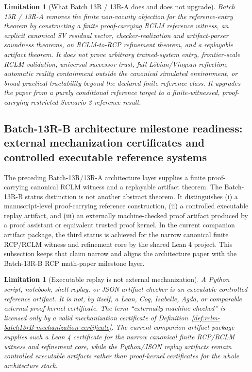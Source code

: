 \documentclass[11pt,a4paper]{article}
\newtheorem{limitation}[theorem]{Limitation}
\begin{document}
\begin{limitation}[What Batch 13R / 13R-A does and does not upgrade]
\label{lim:rclm-batch13r-scope}
Batch 13R / 13R-A removes the finite non-vacuity objection for the reference-entry theorem by constructing a finite proof-carrying RCLM reference witness, an explicit canonical SV residual vector, checker-realization and artifact-parser soundness theorems, an RCLM-to-RCP refinement theorem, and a replayable artifact theorem.  It does not prove arbitrary trained-system entry, frontier-scale RCLM validation, universal successor trust, full L\"obian/Vingean reflection, automatic reality containment outside the canonical simulated environment, or broad practical tractability beyond the declared finite reference class.  It upgrades the paper from a purely conditional reference target to a finite-witnessed, proof-carrying restricted Scenario-3 reference result.
\end{limitation}



\subsection{Batch-13R-B architecture milestone readiness: external mechanization certificates and controlled executable reference systems}
\label{subsec:rclm-batch13rB-mechanized-controlled}

The preceding Batch-13R/13R-A architecture layer supplies a finite proof-carrying canonical RCLM witness and a replayable artifact theorem.  The Batch-13R-B status distinction is not another abstract theorem.  It distinguishes (i) a manuscript-level proof-carrying reference construction, (ii) a controlled executable replay artifact, and (iii) an externally machine-checked proof artifact produced by a proof assistant or equivalent trusted proof kernel.  In the current companion artifact package, the third status is achieved for the narrow canonical finite RCP/RCLM witness and refinement core by the shared Lean 4 project.  This subsection keeps that claim narrow and aligns the architecture paper with the Batch-13R-B RCP math-paper milestone layer.

\begin{limitation}[Executable replay is not external mechanization]
\label{lim:rclm-batch13rB-replay-not-mechanization}
A Python script, notebook, shell replay, or JSON artifact checker is an executable controlled reference artifact.  It is not, by itself, a Lean, Coq, Isabelle, Agda, or comparable external proof-kernel certificate.  The term ``externally machine-checked'' is licensed only by a valid mechanization certificate of Definition~\ref{def:rclm-batch13rB-mechanization-certificate}.  The current companion artifact package supplies such a Lean 4 certificate for the narrow canonical finite RCP/RCLM witness and refinement core, while the Python/JSON replay artifacts remain controlled executable artifacts rather than proof-kernel certificates for the whole architecture stack.
\end{limitation}
\end{document}

